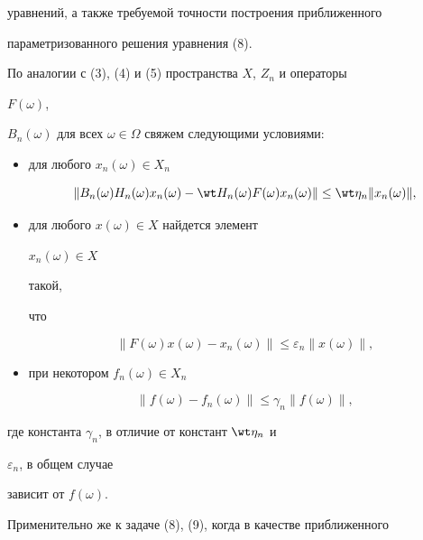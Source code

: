 уравнений, а также требуемой точности построения приближенного


параметризованного решения уравнения (8).





По аналогии с (3), (4) и (5) пространства $X$, $Z_n$ и операторы


$F(\omega)$,


$B_n(\omega)$ для всех $\omega\in\Omega$ свяжем следующими условиями:


\begin{itemize}


\item[1)] для любого $x_n(\omega)\in X_n$


\begin{equation}


\|B_n(\omega)H_n(\omega)x_n(\omega)-\wt H_n(\omega)


F(\omega)x_n(\omega)\|\le\wt\eta_n\|x_n(\omega)\|,


\end{equation}


\item[2)] для любого $x(\omega)\in X$ найдется элемент


$x_n(\omega)\in X$


такой,


что


\begin{equation}


\|F(\omega)x(\omega)-x_n(\omega)\|\le\varepsilon_n\|x(\omega)\|,


\end{equation}


\item[3)] при некотором $f_n(\omega)\in X_n$


\begin{equation}


\|f(\omega)-f_n(\omega)\|\le\gamma_n\|f(\omega)\|,


\end{equation}


\end{itemize}


где константа $\gamma_n$, в отличие от констант $\wt\eta_n$ и


$\varepsilon_n$, в общем случае


зависит от $f(\omega)$.





Применительно же к задаче (8), (9), когда в качестве приближенного


